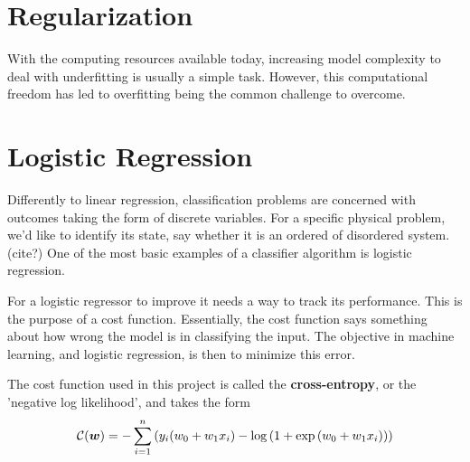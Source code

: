 
\section{Regularization}\label{section:regularization}
With the computing resources available today, increasing model complexity to deal 
with underfitting is usually a simple task. However, this computational freedom 
has led to overfitting being the common challenge to overcome.

\section{Logistic Regression}\label{seq:logistic}
Differently to linear regression, classification problems
are concerned with outcomes taking the form of discrete variables.
For a specific physical problem, we'd like to identify its state, say whether
it is an ordered of disordered system. (cite?) One of the most basic examples
of a classifier algorithm is logistic regression.

For a logistic regressor to improve it needs a way to
track its performance. This is the purpose of a cost function. Essentially,
the cost function says something about how wrong the model is in classifying the
input. The objective in machine learning, and logistic regression, is then to minimize
this error.

The cost function used in this project is called the \textbf{cross-entropy}, or the
'negative log likelihood', and takes the form
\begin{equation}\label{eq:cross-entropy}
	\mathcal{C}({\boldsymbol{w}})=-\sum_{i=1}^n  \left(y_i(w_0+w_1x_i) -\log{(1+\exp{(w_0+w_1x_i)})}\right)
\end{equation}

